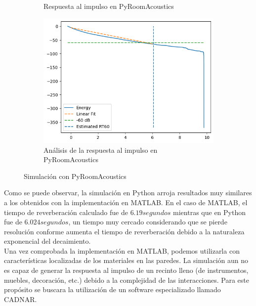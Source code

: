 \begin{figure}[!htb]
\begin{subfigure}{0.3\textwidth}
        \caption{\footnotesize Respuesta al impulso en PyRoomAcoustics}
        \label{fig:sub2_2}
    \end{subfigure}
    \hfill
    \begin{subfigure}{0.3\textwidth}
        \centering
        \includegraphics[width=\linewidth]{imagenes/PyRoom_Decay.png}
        \caption{\footnotesize Análisis de la respuesta al impulso en PyRoomAcoustics}
        \label{fig:sub2_3}
    \end{subfigure}
    \caption{Simulación con PyRoomAcoustics}
\end{figure}
\FloatBarrier
Como se puede observar, la simulación en Python arroja resultados muy similares a los obtenidos con la implementación en MATLAB. En el caso de MATLAB, el tiempo de reverberación calculado fue de $6.19 segundos$ mientras que en Python fue de $6.024 segundos$, un tiempo muy cercado considerando que se pierde resolución conforme aumenta el tiempo de reverberación debido a la naturaleza exponencial del decaimiento. \\
Una vez comprobada la implementación en MATLAB, podemos utilizarla con características localizadas de los materiales en las paredes. La simulación aun no es capaz de generar la respuesta al impulso de un recinto lleno (de instrumentos, muebles, decoración, etc.) debido a la complejidad de las interacciones. Para este propósito se buscara la utilización de un software especializado llamado CADNAR.



